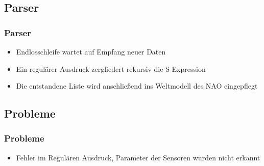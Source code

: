 \subsection{Parser}
\frame
{
  \frametitle{Parser}
  
  \begin{itemize}
    \item Endlosschleife wartet auf Empfang neuer Daten
    \item Ein regul\"arer Ausdruck zergliedert rekursiv die S-Expression\\
    
    \item Die entstandene Liste wird anschlie{\ss}end ins Weltmodell des NAO eingepflegt
  \end{itemize}
}

\subsection{Probleme}
\frame
{
  \frametitle{Probleme}
  
  \begin{itemize}
    \item Fehler im Regul\"aren Ausdruck, Parameter der Sensoren wurden nicht erkannt
  \end{itemize}
}
